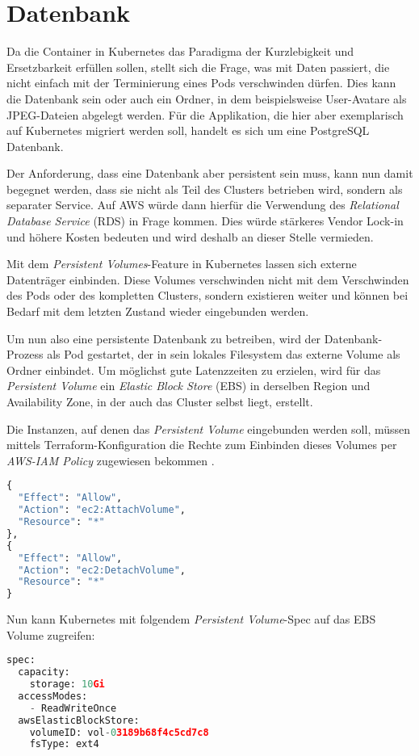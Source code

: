\section{Datenbank}

Da die Container in Kubernetes das Paradigma der Kurzlebigkeit und Ersetzbarkeit
erfüllen sollen, stellt sich die Frage, was mit Daten passiert, die nicht einfach
mit der Terminierung eines Pods verschwinden dürfen. Dies kann die Datenbank sein
oder auch ein Ordner, in dem beispielsweise User-Avatare als JPEG-Dateien abgelegt
werden.
Für die Applikation, die hier aber exemplarisch auf Kubernetes migriert werden soll,
handelt es sich um eine PostgreSQL Datenbank.

Der Anforderung, dass eine Datenbank aber persistent sein muss,
kann nun damit begegnet werden, dass sie nicht als
Teil des Clusters betrieben wird, sondern als separater Service.
Auf AWS würde dann hierfür die Verwendung des
\emph{Relational Database Service} (RDS)
in Frage kommen. Dies würde stärkeres Vendor Lock-in und höhere Kosten bedeuten
und wird deshalb an dieser Stelle vermieden.

Mit dem \emph{Persistent Volumes}-Feature in Kubernetes lassen sich
externe Datenträger einbinden.
Diese Volumes verschwinden nicht mit dem Verschwinden des Pods oder des
kompletten Clusters, sondern existieren weiter und können bei Bedarf mit
dem letzten Zustand wieder eingebunden werden.

Um nun also eine persistente Datenbank zu betreiben, wird der
Datenbank-Prozess als
Pod gestartet, der in sein lokales Filesystem das externe Volume
als Ordner einbindet. Um möglichst gute Latenzzeiten zu
erzielen, wird
für das \emph{Persistent Volume} ein \emph{Elastic Block Store} (EBS)
in derselben
Region und Availability Zone, in der auch das Cluster selbst liegt,
erstellt.

Die Instanzen, auf denen das \emph{Persistent Volume} eingebunden werden soll,
müssen mittels Terraform-Konfiguration die Rechte zum Einbinden dieses
Volumes per \emph{AWS-IAM Policy} zugewiesen bekommen
.

\begin{lstlisting}[language=Python,numbers=none]
{
  "Effect": "Allow",
  "Action": "ec2:AttachVolume",
  "Resource": "*"
},
{
  "Effect": "Allow",
  "Action": "ec2:DetachVolume",
  "Resource": "*"
}
\end{lstlisting}

Nun kann Kubernetes mit folgendem \emph{Persistent Volume}-Spec auf
das EBS Volume
zugreifen:
\begin{lstlisting}[language=Python,numbers=none]
spec:
  capacity:
    storage: 10Gi
  accessModes:
    - ReadWriteOnce
  awsElasticBlockStore:
    volumeID: vol-03189b68f4c5cd7c8
    fsType: ext4
\end{lstlisting}

